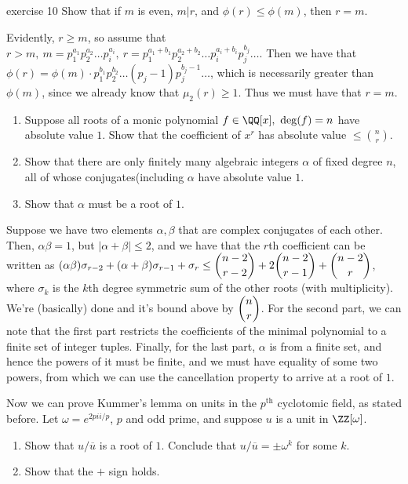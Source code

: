 \begin{problem}{exercise 10}
Show that if \(m\) is even, \(m|r\), and \(\phi(r) \leq \phi(m) \), then \(r=m\).
\end{problem}
Evidently, \(r \ge m\), so assume that \(r > m, \ m=p_1^{a_1}p_2^{a_2} \dots p_i^{a_i}, \ r = p_1^{a_1+b_1}p_2^{a_2+b_2}\dots p_i^{a_i+b_i}p_j^{b_j} \dots\). Then we have that \(\phi(r)=\phi(m)\cdot p_1^{b_1}p_2^{b_2}\dots (p_j-1)p_j^{b_j-1}\dots \), which is necessarily greater than \(\phi(m)\), since we already know that \(\mu_2(r) \ge 1\). Thus we must have that \(r=m\).
\begin{problem}
\begin{enumerate}[label=(\alph*)]
    \item Suppose all roots of a monic polynomial \(f \in \QQ[x], \ \deg(f)=n\) have absolute value \(1\). Show that the coefficient of \(x^r\) has absolute value \(\le \binom{n}{r}\).
    \item Show that there are only finitely many algebraic integers \(\alpha\) of fixed degree \(n\), all of whose conjugates(including \(\alpha\) have absolute value \(1\).
    \item Show that \(\alpha\) must be a root of \(1\).
\end{enumerate}
\end{problem}
Suppose we have two elements \(\alpha, \beta\) that are complex conjugates of each other. Then, \(\alpha\beta= 1\), but \(|\alpha+\beta| \le 2\), and we have that the \(r\)th coefficient can be written as \((\alpha\beta)\sigma_{r-2}+(\alpha+\beta)\sigma_{r-1}+\sigma_r \le \dbinom{n-2}{r-2}+2\dbinom{n-2}{r-1}+\dbinom{n-2}{r}\), where \(\sigma_k\) is the \(k\)th degree symmetric sum of the other roots (with multiplicity). We're (basically) done and it's bound above by \(\dbinom{n}{r}\). For the second part, we can note that the first part restricts the coefficients of the minimal polynomial to a finite set of integer tuples. Finally, for the last part, \(\alpha\) is from a finite set, and hence the powers of it must be finite, and we must have equality of some two powers, from which we can use the cancellation property to arrive at a root of \(1\).

\begin{problem}
Now we can prove Kummer's lemma on units in the \(p^{\textrm{th}}\) cyclotomic field, as stated before. Let \(\omega = e^{2pi i/p}\), \(p\) and odd prime, and suppose \(u\) is a unit in \(\ZZ[\omega]\).
\begin{enumerate}[label=(\alph*)]
    \item Show that \(u/\overline{u}\) is a root of \(1\). Conclude that \(u/\overline{u} = \pm \omega^k\) for some \(k\).
    \item Show that the \(+\) sign holds.
\end{enumerate}
\end{problem}


